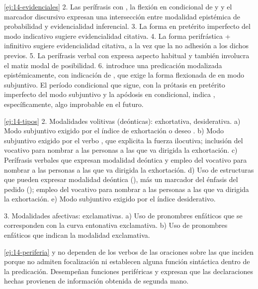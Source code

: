 \begin{solucion}{\ref{ej:14-evidenciales}}
2. Las perífrasis con , la flexión en condicional de
 y  y el marcador discursivo 
expresan una intersección entre modalidad epistémica de probabilidad y
evidencialidad inferencial. 3. La forma en pretérito imperfecto del modo
indicativo  sugiere evidencialidad citativa. 4. La forma
perifrástica  + infinitivo sugiere evidencialidad citativa, a la vez
que la no adhesión a los dichos previos. 5. La perífrasis verbal con
 expresa aspecto habitual y también involucra el matiz modal de
posibilidad. 6.  introduce una predicación modalizada
epistémicamente, con indicación de , que exige la forma
flexionada de  en modo subjuntivo. El período condicional que
sigue, con la prótasis en pretérito imperfecto del modo subjuntivo y la apódosis
en condicional, indica , específicamente, algo improbable en el
futuro.
\end{solucion}

\begin{solucion}{\ref{ej:14-tipos}}
2. Modalidades volitivas (deónticas): exhortativa, desiderativa. a) Modo
subjuntivo exigido por el índice de exhortación o deseo . b) Modo
subjuntivo exigido por el verbo , que explicita la fuerza
ilocutiva; inclusión del vocativo para nombrar a las personas a las que va
dirigida la exhortación. c) Perífrasis verbales que expresan modalidad deóntica
y empleo del vocativo para nombrar a las personas a las que va dirigida la
exhortación. d) Uso de estructuras que pueden expresar modalidad deóntica
(), más un marcador del énfasis del pedido (); empleo del vocativo para nombrar a las personas a las que va
dirigida la exhortación. e) Modo subjuntivo exigido por el índice desiderativo.

3. Modalidades afectivas: exclamativas. a) Uso de pronombres enfáticos que se
corresponden con la curva entonativa exclamativa. b) Uso de pronombres enfáticos
que indican la modalidad exclamativa.
\end{solucion}

\begin{solucion}{\ref{ej:14-periferia}}
 y 
no dependen de los verbos de las oraciones sobre las que inciden porque no
admiten focalización ni establecen alguna función sintáctica dentro de la
predicación. Desempeñan funciones periféricas y expresan que las declaraciones
hechas provienen de información obtenida de segunda mano.
\end{solucion}
